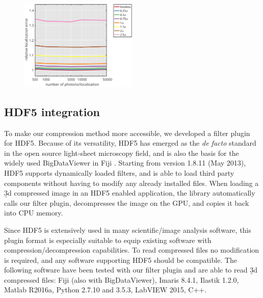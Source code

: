     \begin{figure}[tpb]
      \centering
      \includegraphics[page=1,width=0.5\textwidth]{SFig6_locprecVsNphotons}
      \label{fig:SFig6_locprecVsNphotons}
    \end{figure}



  

  \subsection{HDF5 integration}
  To make our compression method more accessible, we developed a filter plugin for HDF5. Because of its versatility, HDF5 has emerged as the \textit{de facto} standard in the open source light-sheet microscopy field, and is also the basis for the widely used BigDataViewer \cite{pietzsch_bigdataviewer:_2015} in Fiji \cite{schindelin_fiji:_2012}. Starting from version 1.8.11 (May 2013), HDF5 supports dynamically loaded filters, and is able to load third party components without having to modify any already installed files. When loading a \b3d compressed image in an HDF5 enabled application, the library automatically calls our filter plugin, decompresses the image on the GPU, and copies it back into CPU memory.
  
  Since HDF5 is extensively used in many scientific/image analysis software, this plugin format is especially suitable to equip existing software with compression/decompression capabilities. To read compressed files no modification is required, and any software supporting HDF5 should be compatible. The following software have been tested with our filter plugin and are able to read \b3d compressed files:
  Fiji (also with BigDataViewer), Imaris 8.4.1, Ilastik 1.2.0, Matlab R2016a, Python 2.7.10 and 3.5.3, LabVIEW 2015, C++.
  
